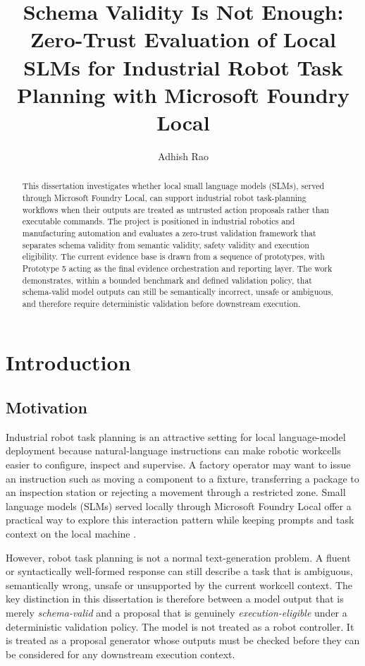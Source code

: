 \documentclass[sigconf,nonacm]{acmart}
\title{Schema Validity Is Not Enough: Zero-Trust Evaluation of Local SLMs for Industrial Robot Task Planning with Microsoft Foundry Local}
\author{Adhish Rao}
\affiliation{
  \institution{University College London}
  \department{MSc Systems Engineering for the Internet of Things}
  \country{United Kingdom}
}
\begin{document}
\begin{abstract}
This dissertation investigates whether local small language models (SLMs), served through Microsoft Foundry Local, can support industrial robot task-planning workflows when their outputs are treated as untrusted action proposals rather than executable commands. The project is positioned in industrial robotics and manufacturing automation and evaluates a zero-trust validation framework that separates schema validity from semantic validity, safety validity and execution eligibility. The current evidence base is drawn from a sequence of prototypes, with Prototype 5 acting as the final evidence orchestration and reporting layer. The work demonstrates, within a bounded benchmark and defined validation policy, that schema-valid model outputs can still be semantically incorrect, unsafe or ambiguous, and therefore require deterministic validation before downstream execution.
\end{abstract}


\maketitle

\section{Introduction}

\subsection{Motivation}
\label{sec:introduction_motivation}

Industrial robot task planning is an attractive setting for local language-model deployment because natural-language instructions can make robotic workcells easier to configure, inspect and supervise. A factory operator may want to issue an instruction such as moving a component to a fixture, transferring a package to an inspection station or rejecting a movement through a restricted zone. Small language models (SLMs) served locally through Microsoft Foundry Local offer a practical way to explore this interaction pattern while keeping prompts and task context on the local machine \cite{microsoft_foundry_local_docs}.

However, robot task planning is not a normal text-generation problem. A fluent or syntactically well-formed response can still describe a task that is ambiguous, semantically wrong, unsafe or unsupported by the current workcell context. The key distinction in this dissertation is therefore between a model output that is merely \emph{schema-valid} and a proposal that is genuinely \emph{execution-eligible} under a deterministic validation policy. The model is not treated as a robot controller. It is treated as a proposal generator whose outputs must be checked before they can be considered for any downstream execution context.
\end{document}
